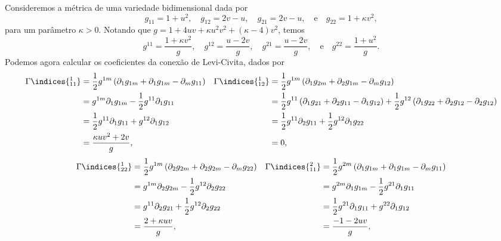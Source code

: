 Consideremos a métrica de uma variedade bidimensional dada por
\begin{equation*}
    g_{11} = 1+u^2,\quad g_{12} = 2v - u,\quad g_{21} = 2v - u, \quad\text{e}\quad g_{22} = 1 + \kappa v^2,
\end{equation*}
para um parâmetro \(\kappa > 0\). Notando que \(g = 1 + 4 uv + \kappa u^2 v^2 + (\kappa-4)v^2\), temos
\begin{equation*}
    g^{11} = \frac{1 + \kappa v^2}{g},\quad g^{12} = \frac{u-2v}{g},\quad g^{21} = \frac{u-2v}{g},\quad\text{e}\quad g^{22} = \frac{1+u^2}{g}.
\end{equation*}
Podemos agora calcular os coeficientes da conexão de Levi-Civita, dados por
\begin{align*}
    \Gamma\indices{^1_{11}} &= \frac12g^{1m}\left(\partial_1 g_{1m} + \partial_1 g_{1m} - \partial_m g_{11}\right)&
    \Gamma\indices{^1_{12}} &= \frac12g^{1m}\left(\partial_1 g_{2m} + \partial_2 g_{1m} - \partial_m g_{12}\right)\\
                            &= g^{1m} \partial_1 g_{1m} - \frac12 g^{11} \partial_1 g_{11}&
                            &= \frac12 g^{11}\left(\partial_1 g_{21} + \partial_2 g_{11} - \partial_1 g_{12}\right) + \frac12g^{12}\left(\partial_1g_{22} + \partial_2 g_{12} - \partial_2 g_{12}\right)\\
                            &= \frac12 g^{11}\partial_1 g_{11} + g^{12}\partial_1 g_{12}&
                            &= \frac12 g^{11}\partial_2 g_{11} + \frac12 g^{12}\partial_1g_{22}\\
                            &= \frac{\kappa u v^2 + 2 v}{g}, &
                            &= 0,
\end{align*}
\begin{align*}
    \Gamma\indices{^1_{22}} &= \frac12 g^{1m}\left(\partial_2 g_{2m} + \partial_2 g_{2m} - \partial_m g_{22}\right)&
    \Gamma\indices{^2_{11}} &= \frac12 g^{2m}\left(\partial_1 g_{1m} + \partial_1 g_{1m} - \partial_m g_{11}\right)\\
                            &= g^{1m} \partial_2 g_{2m} - \frac12 g^{12} \partial_2 g_{22}&
                            &= g^{2m} \partial_1 g_{1m} - \frac12 g^{21} \partial_1 g_{11}\\
                            &= g^{11} \partial_2 g_{21} + \frac12 g^{12} \partial_2 g_{22}&
                            &= \frac12g^{21}\partial_1 g_{11} + g^{22} \partial_1 g_{12}\\
                            &=\frac{2 + \kappa u v}{g},&
                            &=\frac{-1-2uv}{g},
\end{align*}
